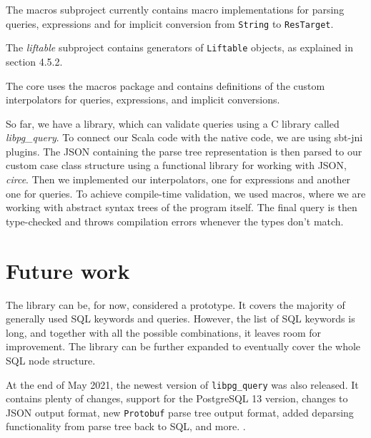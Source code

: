 \begin{description}[font=$\bullet$~\normalfont\scshape\color{black}\\]
The macros subproject currently contains macro implementations for parsing queries, expressions and for implicit conversion from \texttt{String} to \texttt{ResTarget}.

The \textit{liftable} subproject contains generators of \texttt{Liftable} objects, as explained in section 4.5.2.
\item [Core] \hfill \newline
The core uses the macros package and contains definitions of the custom interpolators for queries, expressions, and implicit conversions.

\end{description}
So far, we have a library, which can validate queries using a C library called \textit{libpg\_query}. To connect our Scala code with the native code, we are using sbt-jni plugins. The JSON containing the parse tree representation is then parsed to our custom case class structure using a functional library for working with JSON, \textit{circe}. Then we implemented our interpolators, one for expressions and another one for queries. To achieve compile-time validation, we used macros, where we are working with abstract syntax trees of the program itself. The final query is then type-checked and throws compilation errors whenever the types don't match.


\section{Future work}
The library can be, for now, considered a prototype. It covers the majority of generally used SQL keywords and queries. However, the list of SQL keywords is long, and together with all the possible combinations, it leaves room for improvement. The library can be further expanded to eventually cover the whole SQL node structure. 

At the end of May 2021, the newest version of \texttt{libpg\_query} was also released. It contains plenty of changes, support for the PostgreSQL 13 version, changes to JSON output format, new \texttt{Protobuf} parse tree output format, added deparsing functionality from parse tree back to SQL, and more. \cite{libpgquery13}. 
